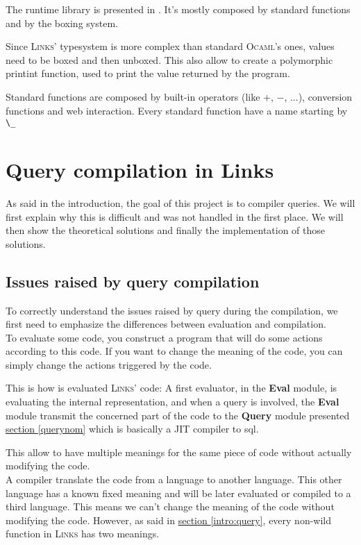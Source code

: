 \documentclass[11pt]{article}
\newcommand\mysc[1]{{\rmfamily\textsc{#1}}\xspace}
\newcommand\links{\mysc{Links}}
\newcommand\ocaml{\mysc{Ocaml}}
\newcommand\refsec[1]{\hyperref[#1]{section \ref*{#1}}}
\newcommand\ocamlc[1]{\lstinline[language={[Objective]Caml},basicstyle=\ttfamily\normalsize]{#1}}
\newcommand\module[1]{{\bf #1}}
\begin{document}
The runtime library is presented in \cite{links:comp}. It's mostly composed by standard functions and by the boxing system. 

Since \links' typesystem is more complex than standard \ocaml's ones, values need to be boxed and then unboxed. This also allow to create a polymorphic printint function, used to print the value returned by the program.

Standard functions are composed by built-in operators (like $+$, $-$, ...), conversion functions and web interaction. Every standard function have a name starting by \ocamlc{\_}

\section{Query compilation in Links}

As said in the introduction, the goal of this project is to compiler queries. We will first explain why this is difficult and was not handled in the first place. We will then show the theoretical solutions and finally the implementation of those solutions.

\subsection{Issues raised by query compilation}

To correctly understand the issues raised by query during the compilation, we first need to emphasize the differences between evaluation and compilation. \\

To evaluate some code, you construct a program that will do some actions according to this code. If you want to change the meaning of the code, you can simply change the actions triggered by the code. 

This is how is evaluated \links' code: A first evaluator, in the \module{Eval} module, is evaluating the internal representation, and when a query is involved, the \module{Eval} module transmit the concerned part of the code to the \module{Query} module presented \refsec{querynom} which is basically a JIT compiler to sql.

This allow to have multiple meanings for the same piece of code without actually modifying the code.\\

A compiler translate the code from a language to another language. This other language has a known fixed meaning and will be later evaluated or compiled to a third language. This means we can't change the meaning of the code without modifying the code. However, as said in \refsec{intro:query}, every non-wild function in \links has two meanings.
\end{document}
